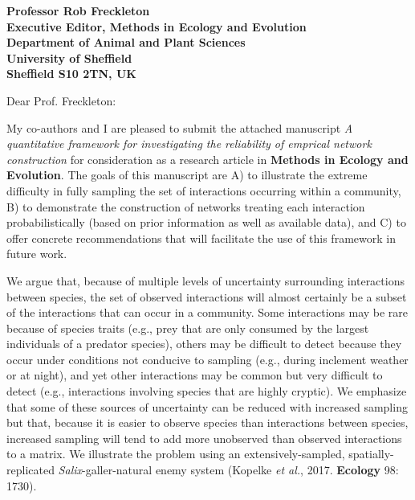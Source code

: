 \documentclass[12pt]{letter}
\begin{document}
\begin{letter}{\bf Professor Rob Freckleton\\
               Executive Editor, Methods in Ecology and Evolution\\
               Department of Animal and Plant Sciences\\
               University of Sheffield\\
               Sheffield S10 2TN, UK
                               }


\opening{Dear Prof. Freckleton:}

    My co-authors and I are pleased to submit the attached manuscript \emph{A quantitative framework for investigating the reliability of emprical network construction} for consideration as a research article in \textbf{Methods in Ecology and Evolution}. The goals of this manuscript are A) to illustrate the extreme difficulty in fully sampling the set of interactions occurring within a community, B) to demonstrate the construction of networks treating each interaction probabilistically (based on prior information as well as available data), and C) to offer concrete recommendations that will facilitate the use of this framework in future work.


    We argue that, because of multiple levels of uncertainty surrounding interactions between species, the set of observed interactions will almost certainly be a subset of the interactions that can occur in a community. Some interactions may be rare because of species traits (e.g., prey that are only consumed by the largest individuals of a predator species), others may be difficult to detect because they occur under conditions not conducive to sampling (e.g., during inclement weather or at night), and yet other interactions may be common but very difficult to detect (e.g., interactions involving species that are highly cryptic). We emphasize that some of these sources of uncertainty can be reduced with increased sampling but that, because it is easier to observe species than interactions between species, increased sampling will tend to add more unobserved than observed interactions to a matrix. We illustrate the problem using an extensively-sampled, spatially-replicated \emph{Salix}-galler-natural enemy system (Kopelke \emph{et al.}, 2017. \textbf{Ecology} 98: 1730).



\end{letter}
\end{document}
